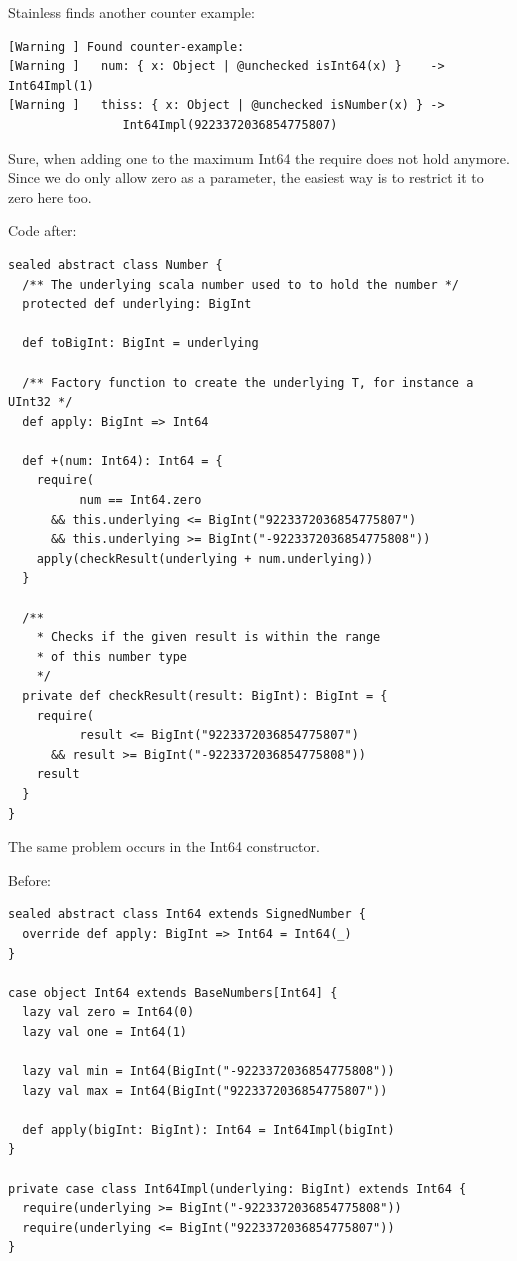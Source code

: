 \documentclass[runningheads]{llncs}
\begin{document}
Stainless finds another counter example:
\begin{lstlisting}[style=stainless]
[Warning ] Found counter-example:
[Warning ]   num: { x: Object | @unchecked isInt64(x) }    -> Int64Impl(1)
[Warning ]   thiss: { x: Object | @unchecked isNumber(x) } ->
                Int64Impl(9223372036854775807)
\end{lstlisting}

Sure, when adding one to the maximum Int64 the require does not hold anymore.
Since we do only allow zero as a parameter, the easiest way is to restrict it to zero here too.

Code after:
\begin{lstlisting}[style=scala]
sealed abstract class Number {
  /** The underlying scala number used to to hold the number */
  protected def underlying: BigInt

  def toBigInt: BigInt = underlying

  /** Factory function to create the underlying T, for instance a UInt32 */
  def apply: BigInt => Int64

  def +(num: Int64): Int64 = {
    require(
          num == Int64.zero
      && this.underlying <= BigInt("9223372036854775807")
      && this.underlying >= BigInt("-9223372036854775808"))
    apply(checkResult(underlying + num.underlying))
  }

  /**
    * Checks if the given result is within the range
    * of this number type
    */
  private def checkResult(result: BigInt): BigInt = {
    require(
          result <= BigInt("9223372036854775807")
      && result >= BigInt("-9223372036854775808"))
    result
  }
}
\end{lstlisting}

The same problem occurs in the Int64 constructor.

Before:
\begin{lstlisting}[style=scala]
sealed abstract class Int64 extends SignedNumber {
  override def apply: BigInt => Int64 = Int64(_)
}

case object Int64 extends BaseNumbers[Int64] {
  lazy val zero = Int64(0)
  lazy val one = Int64(1)

  lazy val min = Int64(BigInt("-9223372036854775808"))
  lazy val max = Int64(BigInt("9223372036854775807"))

  def apply(bigInt: BigInt): Int64 = Int64Impl(bigInt)
}

private case class Int64Impl(underlying: BigInt) extends Int64 {
  require(underlying >= BigInt("-9223372036854775808"))
  require(underlying <= BigInt("9223372036854775807"))
}
\end{lstlisting}
\end{document}
